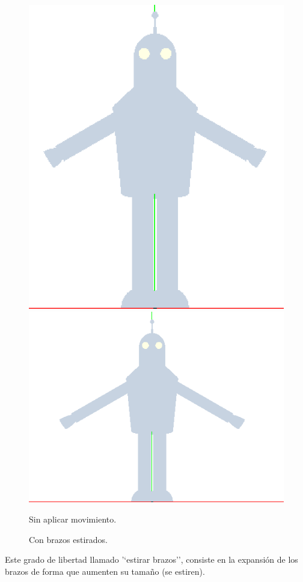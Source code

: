 \documentclass{article}
\begin{document}
		\begin{figure}[h]
		\includegraphics[width=0.4\linewidth]{cabeza1}
		\includegraphics[width=0.65\linewidth]{estirarbrazos}
		\caption{Sin aplicar movimiento.}
		\caption{Con brazos estirados.}
		\label{fig:estirarbrazos}
	\end{figure}

	Este grado de libertad llamado '`estirar brazos'', consiste en la expansión de los brazos de forma que aumenten su tamaño (se estiren).
	
\end{document}
